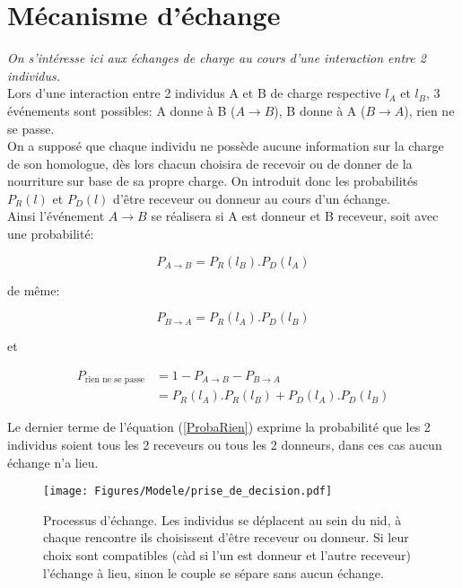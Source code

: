 \section{Mécanisme d'échange}

\textit{On s'intéresse ici aux échanges de charge au cours d'une interaction entre 2 individus.}\\

Lors d'une interaction entre 2 individus A et B de charge respective $l_A$ et $l_B$, 3 événements sont possibles: A donne à B ($A \rightarrow B$), B donne à A ($B \rightarrow A$), rien ne se passe.\\

On a supposé que chaque individu ne possède aucune information sur la charge de son homologue, dès lors chacun choisira de recevoir ou de donner de la nourriture sur base de sa propre charge. On introduit donc les probabilités $P_R(l)$ et $P_D(l)$ d'être receveur ou donneur au cours d'un échange.\\


Ainsi l'événement $A \rightarrow B$ se réalisera si A est donneur et B receveur, soit avec une probabilité:

\begin{equation}
P_{A \rightarrow B} = P_R(l_B) . P_D(l_A)
\label{ProbaAdonneB}
\end{equation}

de même:

\begin{equation}
P_{B \rightarrow A} = P_R(l_A) . P_D(l_B)
\label{ProbaBdonneA}
\end{equation}

et 

\begin{equation}
\begin{aligned}
P_{\text{rien ne se passe}} &= 1- P_{A \rightarrow B} - P_{B \rightarrow A}\\
&= P_R(l_A) . P_R(l_B) + P_D(l_A) . P_D(l_B)
\end{aligned}
\label{ProbaRien}
\end{equation}

Le dernier terme de l'équation (\ref{ProbaRien}) exprime la probabilité que les 2 individus soient tous les 2 receveurs ou tous les 2 donneurs, dans ces cas aucun échange n'a lieu.\\

\begin{figure}[h]
\centering
\texttt{[image: Figures/Modele/prise\_de\_decision.pdf]}
\caption{Processus d'échange. Les individus se déplacent au sein du nid, à chaque rencontre ils choisissent d'être receveur ou donneur. Si leur choix sont compatibles (càd si l'un est donneur et l'autre receveur) l'échange à lieu, sinon le couple se sépare sans aucun échange.}
\label{echanges}
\end{figure}

